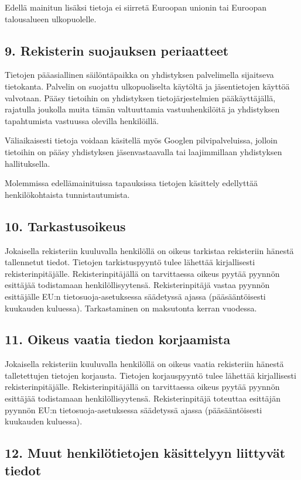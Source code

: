 \documentclass[finnish]{tktltiki}
\begin{document}
Edellä mainitun lisäksi tietoja ei siirretä Euroopan unionin tai Euroopan talousalueen ulkopuolelle.

\subsection*{9. Rekisterin suojauksen periaatteet}

Tietojen pääasiallinen säilöntäpaikka on yhdistyksen palvelimella sijaitseva tietokanta. Palvelin on suojattu ulkopuoliselta käytöltä ja jäsentietojen käyttöä valvotaan. Pääsy tietoihin on yhdistyksen tietojärjestelmien pääkäyttäjällä, rajatulla joukolla muita tämän valtuuttamia vastuuhenkilöitä ja yhdistyksen tapahtumista vastuussa olevilla henkilöillä.

Väliaikaisesti tietoja voidaan käsitellä myös Googlen pilvipalveluissa, jolloin tietoihin on pääsy yhdistyksen jäsenvastaavalla tai laajimmillaan yhdistyksen hallituksella.

Molemmissa edellämainituissa tapauksissa tietojen käsittely edellyttää henkilökohtaista tunnistautumista.

\subsection*{10. Tarkastusoikeus}

Jokaisella rekisteriin kuuluvalla henkilöllä on oikeus tarkistaa rekisteriin hänestä tallennetut tiedot. Tietojen tarkistuspyyntö tulee lähettää kirjallisesti rekisterinpitäjälle. Rekisterinpitäjällä on tarvittaessa oikeus pyytää pyynnön esittäjää todistamaan henkilöllisyytensä. Rekisterinpitäjä vastaa pyynnön esittäjälle EU:n tietosuoja-asetuksessa säädetyssä ajassa (pääsääntöisesti kuukauden kuluessa). Tarkastaminen on maksutonta kerran vuodessa.

\subsection*{11. Oikeus vaatia tiedon korjaamista}

Jokaisella rekisteriin kuuluvalla henkilöllä on oikeus vaatia rekisteriin hänestä talletettujen tietojen korjausta. Tietojen korjauspyyntö tulee lähettää kirjallisesti rekisterinpitäjälle. Rekisterinpitäjällä on tarvittaessa oikeus pyytää pyynnön esittäjää todistamaan henkilöllisyytensä. Rekisterinpitäjä toteuttaa esittäjän pyynnön EU:n tietosuoja-asetuksessa säädetyssä ajassa (pääsääntöisesti kuukauden kuluessa).

\subsection*{12. Muut henkilötietojen käsittelyyn liittyvät tiedot}
\end{document}
